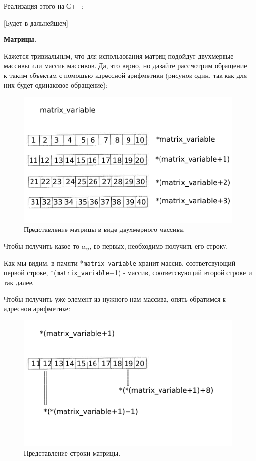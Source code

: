 \documentclass[12pt]{extarticle}
\begin{document}
	Реализация этого на С++:
	
		[Будет в дальнейшем]
		
	\centerline{\textbf{Матрицы.}}
		
		Кажется тривиальным, что для использования матриц подойдут двухмерные массивы или массив массивов. Да, это верно, но давайте рассмотрим обращение к таким объектам с помощью адрессной арифметики (рисунок один, так как для них будет одинаковое обращение):
		
	\begin{figure}[h]
			\centering
			\includegraphics[width=0.8\linewidth]{matrix_1.png}
			\caption{Представление матрицы в виде двухмерного массива.}
			\label{fig:mpr}
	\end{figure}
	
	\newpage
	
	Чтобы получить какое-то $a_{ij}$, во-первых, необходимо получить его строку.
	
	Как мы видим, в памяти *\texttt{matrix\_variable} хранит массив, соответсвующий первой строке, *(\texttt{matrix\_variable}+1) - массив, соответсвующий второй строке и так далее.
	
	Чтобы получить уже элемент из нужного нам массива, опять обратимся к адресной арифметике:
	
	
	
	\begin{figure}[h]
			\centering
			\includegraphics[width=0.8\linewidth]{matrix_2.png}
			\caption{Представление строки матрицы.}
			\label{fig:mpr}
	\end{figure}
	
\end{document}
